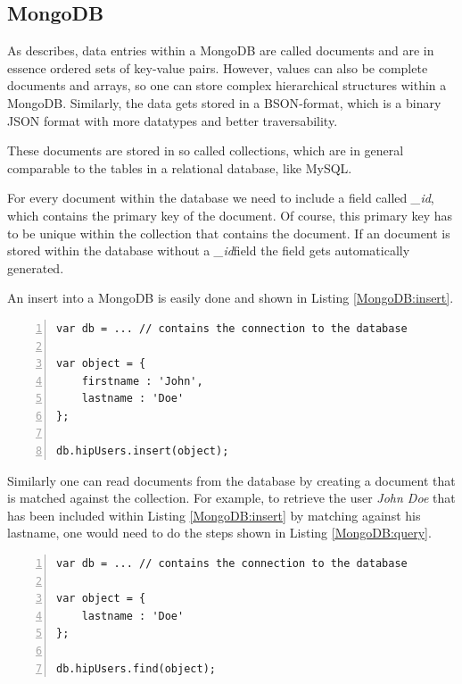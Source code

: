 \subsection{MongoDB}
As \cite{Tre14} describes, data entries within a MongoDB are called documents and are in essence ordered sets of key-value pairs. However, values can also be complete documents and arrays, so one can store complex hierarchical structures within a MongoDB. Similarly, the data gets stored in a \ac{BSON}-format, which is a binary \ac{JSON} format with more datatypes and better traversability.

These documents are stored in so called collections, which are in general comparable to the tables in a relational database, like \ac{MySQL}.

For every document within the database we need to include a field called \textit{\_id}, which contains the primary key of the document. Of course, this primary key has to be unique within the collection that contains the document. If an document is stored within the database without a \textit{\_id}field the field gets automatically generated.

An insert into a MongoDB is easily done and shown in Listing \ref{MongoDB:insert}. 

\begin{lstlisting}[numbers=left,caption={Inserting into a MongoDB},label=MongoDB:insert,frame=tlbr,breaklines]
var db = ... // contains the connection to the database

var object = {
	firstname : 'John',
	lastname : 'Doe'
};

db.hipUsers.insert(object);
\end{lstlisting}

Similarly one can read documents from the database by creating a document that is matched against the collection.
For example, to retrieve the user \textit{John Doe} that has been included within Listing \ref{MongoDB:insert} by matching against his lastname, one would need to do the steps shown in Listing \ref{MongoDB:query}. 

\begin{lstlisting}[numbers=left,caption={Reading documents from a MongoDB},label=MongoDB:insert,frame=tlbr,breaklines]
var db = ... // contains the connection to the database

var object = {
	lastname : 'Doe'
};

db.hipUsers.find(object);
\end{lstlisting}

